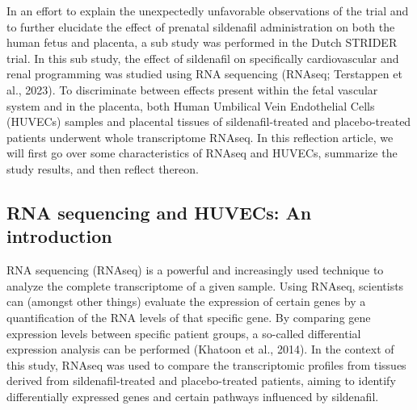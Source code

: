 \documentclass[authordate, reflection]{jote-new-article}
\begin{document}
	In an effort to explain the unexpectedly unfavorable observations of the trial and to further elucidate the effect of prenatal sildenafil administration on both the human fetus and placenta, a sub study was performed in the Dutch STRIDER trial. In this sub study, the effect of sildenafil on specifically cardiovascular and renal programming was studied using RNA sequencing (RNAseq; Terstappen et al., 2023). To discriminate between effects present within the fetal vascular system and in the placenta, both Human Umbilical Vein Endothelial Cells (HUVECs) samples and placental tissues of sildenafil-treated and placebo-treated patients underwent whole transcriptome RNAseq. In this reflection article, we will first go over some characteristics of RNAseq and HUVECs, summarize the study results, and then reflect thereon.







	\subsection{RNA sequencing and HUVECs: An introduction}



	RNA sequencing (RNAseq) is a powerful and increasingly used technique to analyze the complete transcriptome of a given sample. Using RNAseq, scientists can (amongst other things) evaluate the expression of certain genes by a quantification of the RNA levels of that specific gene. By comparing gene expression levels between specific patient groups, a so-called differential expression analysis can be performed (Khatoon et al., 2014). In the context of this study, RNAseq was used to compare the transcriptomic profiles from tissues derived from sildenafil-treated and placebo-treated patients, aiming to identify differentially expressed genes and certain pathways influenced by sildenafil.
\end{document}
